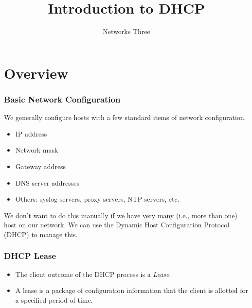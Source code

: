 \documentclass[10pt]{beamer}
\title{Introduction to DHCP}
\author[IN715]{Networks Three}
\institute[Otago Polytechnic]{
  Otago Polytechnic \\
  Dunedin, New Zealand \\
}
\date{}
\begin{document}
\begin{frame}[plain]
  \titlepage
\end{frame}

\section{Overview}
\begin{frame}
  \frametitle{Basic Network Configuration}

  We generally configure hosts with a few standard items of network configuration.
  \begin{itemize}
    \item IP address
    \item Network mask
    \item Gateway address
    \item DNS server addresses
    \item Others:  syslog servers, proxy servers, NTP servers, etc.
  \end{itemize} 

  We don't want to do this manually if we have very many (i.e., more than one) host on our network.  We can use the Dynamic Host Configuration Protocol (DHCP) to manage this. 
\end{frame}



\begin{frame}
  \frametitle{DHCP Lease}
  \begin{itemize}
    \item The client outcome of the DHCP process is a \emph{Lease}.
    \item A lease is a package of configuration information that the client
          is allotted for a specified period of time.
  \end{itemize}  
\end{frame}
\end{document}
